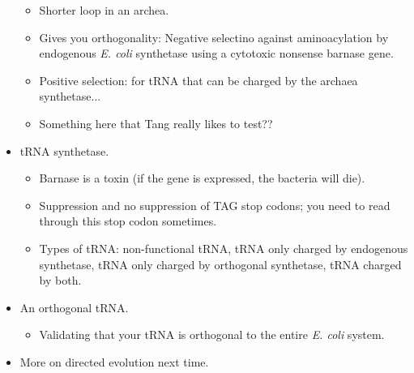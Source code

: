 \documentclass[../notes.tex]{subfiles}
\begin{document}
\begin{itemize}
\begin{itemize}
        \item Shorter loop in an archea.
        \item Gives you orthogonality: Negative selectino against aminoacylation by endogenous \emph{E. coli} synthetase using a cytotoxic nonsense barnase gene.
        \item Positive selection: for tRNA that can be charged by the archaea synthetase...
        \item Something here that Tang really likes to test??
    \end{itemize}
    \item tRNA synthetase.
    \begin{itemize}
        \item Barnase is a toxin (if the gene is expressed, the bacteria will die).
        \item Suppression and no suppression of TAG stop codons; you need to read through this stop codon sometimes.
        \item Types of tRNA: non-functional tRNA, tRNA only charged by endogenous synthetase, tRNA only charged by orthogonal synthetase, tRNA charged by both.
    \end{itemize}
    \item An orthogonal tRNA.
    \begin{itemize}
        \item Validating that your tRNA is orthogonal to the entire \emph{E. coli} system.
    \end{itemize}
    \item More on directed evolution next time.
\end{itemize}
\end{document}
